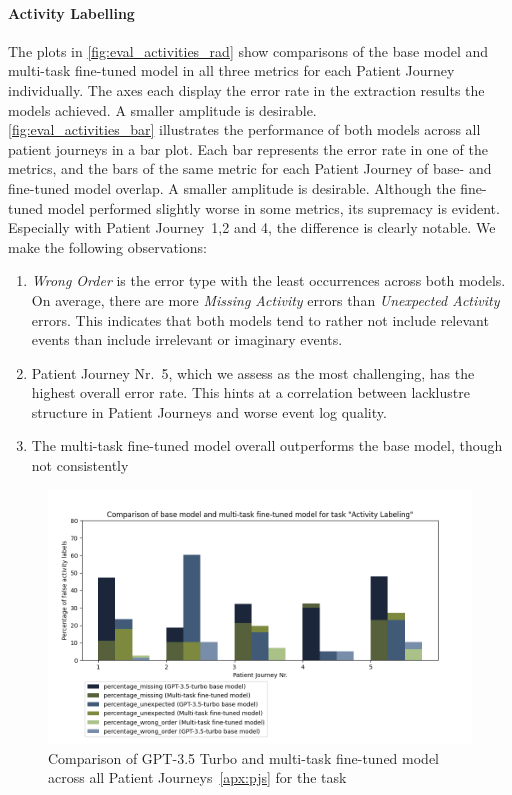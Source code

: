 \paragraph{Activity Labelling} The plots in \autoref{fig:eval_activities_rad} show comparisons of the base model and multi-task fine-tuned model in all three metrics for each Patient Journey individually. The axes each display the error rate in the extraction results the models achieved. A smaller amplitude is desirable.\\
\autoref{fig:eval_activities_bar} illustrates the performance of both models across all patient journeys in a bar plot. Each bar represents the error rate in one of the metrics, and the bars of the same metric for each Patient Journey of base- and fine-tuned model overlap. A smaller amplitude is desirable. Although the fine-tuned model performed slightly worse in some metrics, its supremacy is evident. Especially with Patient Journey~1,2 and 4, the difference is clearly notable. We make the following observations:
\begin{enumerate}
    \item \emph{Wrong Order} is the error type with the least occurrences across both models. On average, there are more \emph{Missing Activity} errors than \emph{Unexpected Activity} errors. This indicates that both models tend to rather not include relevant events than include irrelevant or imaginary events.
    \item Patient Journey Nr.~5, which we assess as the most challenging, has the highest overall error rate. This hints at a correlation between lacklustre structure in Patient Journeys and worse event log quality.
    \item The multi-task fine-tuned model overall outperforms the base model, though not consistently
\end{enumerate}

\begin{figure}[ht]
    \centering
    \captionsetup{belowskip=0pt,aboveskip=0pt}
    \includegraphics[width=\textwidth]{bachelor_thesis/images/activities_all.png}
    \caption{Comparison of GPT-3.5 Turbo and multi-task fine-tuned model across all Patient Journeys~\ref{apx:pjs} for the task } 
    \label{fig:eval_activities_bar}
\end{figure}


